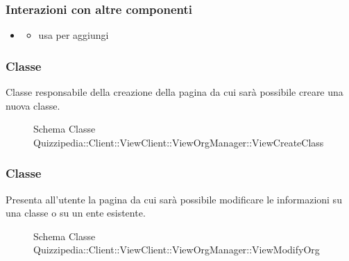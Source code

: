 \subsubsection{Interazioni con altre componenti}
\begin{itemize}
\item {}
\begin{itemize}
\item usa  per aggiungi
\end{itemize}
\end{itemize}
\subsubsection{Classe }
Classe responsabile della creazione della pagina da cui sarà possibile creare una nuova classe.
\begin{figure}[H]
\centering
\noindent{}
\caption[Schema Classe ViewCreateClass]{Schema Classe Quizzipedia::Client::ViewClient::ViewOrgManager::ViewCreateClass}
\end{figure}
\subsubsection{Classe }
Presenta all'utente la pagina da cui sarà possibile modificare le informazioni su una classe o su un ente esistente.
\begin{figure}[H]
\centering
\noindent{}
\caption[Schema Classe ViewModifyOrg]{Schema Classe Quizzipedia::Client::ViewClient::ViewOrgManager::ViewModifyOrg}
\end{figure}
